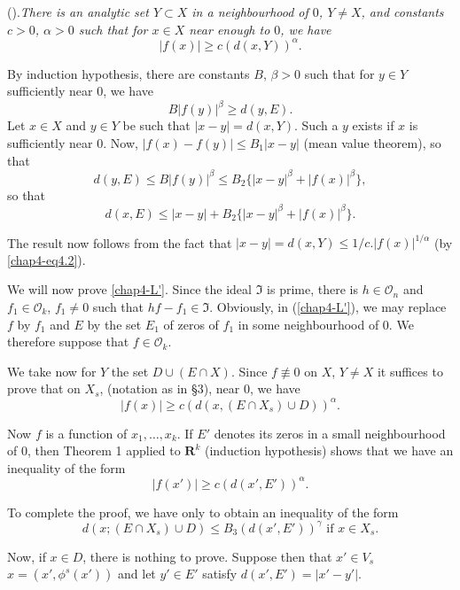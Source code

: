 (\label{chap4-L'}).\pageoriginale \textit{There is an analytic set $Y \subset X$ in a neighbourhood of $0$, $Y \neq X$, and constants $c>0$, $\alpha > 0$ such that for $x \in X$ near enough to $0$, we have}
\setcounter{equation}{1}
\begin{equation}
  |f(x)| \geq c (d (x, Y))^\alpha. \label{chap4-eq4.2}
\end{equation}

\medskip
{} By induction hypothesis, there are constants $B$, $\beta >0$ such that for $y \in Y$ sufficiently near 0, we have
$$
B |f(y)|^\beta \geq d (y,E).
$$
Let $x \in X$ and $y \in Y$ be such that $|x-y| = d(x, Y)$. Such a $y$ exists if $x$ is sufficiently near $0$. Now, $|f(x) - f(y)| \leq B_1 |x - y|$ (mean value theorem), so that
$$
d(y, E) \leq B |f(y)|^\beta  \leq B_2 \{|x - y|^\beta + |f(x)|^\beta\}, 
$$
so that
$$
d (x, E) \leq |x-y| + B_2 \{|x-y|^\beta + |f (x)|^\beta\}.
$$

The result now follows from the fact that $|x-y| = d(x, Y) \leq 1/c. |f(x)|^{1/\alpha}$ (by \eqref{chap4-eq4.2}).

We will now prove \ref{chap4-L'}. Since the ideal $\mathfrak{I}$ is prime, there is $h \in \mathcal{O}_n$ and $f_1 \in \mathcal{O}_k$, $f_1 \neq 0$ such that $hf-f_1 \in \mathfrak{I}$. Obviously, in (\ref{chap4-L'}), we may replace $f$ by $f_1$ and $E$ by the set $E_1$ of zeros of $f_1$ in some neighbourhood of $0$. We therefore suppose that $f\in \mathcal{O}_k$.

We take now for $Y$ the set $D \cup (E \cap X)$. Since $f\not\equiv 0$ on $X$, $Y \neq X$ it suffices to prove that on $X_s$, (notation as in \S 3), near 0, we have
$$
|f(x)| \geq c (d(x, (E \cap X_s)\cup D ))^\alpha.
$$

Now $f$ is a function of $x_1, \ldots, x_k$. If $E'$ denotes its zeros in a small neighbourhood of $0$, then Theorem 1 applied to $\mathbf{R}^k$ (induction hypothesis) shows that we have an inequality of the form
$$
|f(x')| \geq c (d (x', E'))^\alpha.
$$

To complete the proof, we have only to obtain an inequality of the form
\begin{equation}
d (x ; (E \cap X_s) \cup D) \leq B_3 (d (x', E'))^\gamma \text{ if } x \in X_s. \label{chap4-eq4.3}
\end{equation}

Now, if $x \in D$, there is nothing to prove. Suppose then that $x'\in V_s$ $x = (x', \phi^s (x'))$ and let $y'\in E'$ satisfy $d(x',E') = |x'-y'|$.

